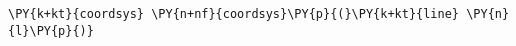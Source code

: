 \begin{Verbatim}[commandchars=\\\{\}]
    \PY{k+kt}{coordsys} \PY{n+nf}{coordsys}\PY{p}{(}\PY{k+kt}{line} \PY{n}{l}\PY{p}{)}
\end{Verbatim}
